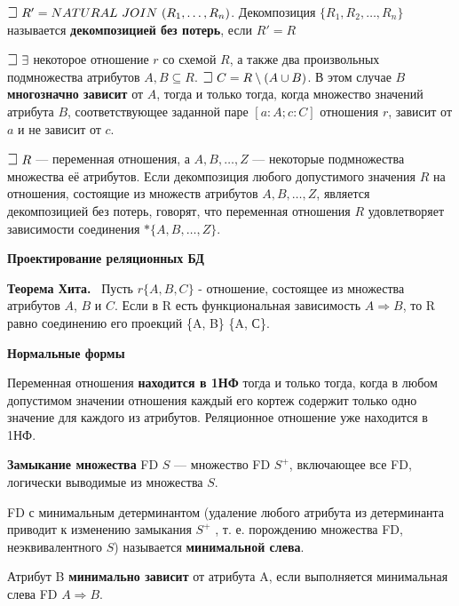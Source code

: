 $\mathLet ~ R' = NATURAL~JOIN~(R_1, \dots, R_n)$.
Декомпозиция $\{R_1, R_2, \dots , R_n\}$ называется \textbf{декомпозицией без потерь}, если $R' = R$

$\mathLet  ~ \exists$ некоторое отношение $r$ со схемой $R$, а также два произвольных подмножества атрибутов $A,B\subseteq R$. 
$\mathLet ~ C = R \setminus (A\cup B)$.
В этом случае $B$ \textbf{многозначно зависит} от $A$, тогда и только тогда, когда множество значений атрибута $B$, соответствующее заданной паре $[a:A;c:C]$ отношения $r$, зависит от $a$ и не зависит от $c$.

$\mathLet ~ R$ --- переменная отношения, а $A, B, \dots, Z$ --- некоторые подмножества множества её атрибутов.
Если декомпозиция любого допустимого значения $R$ на отношения, состоящие из множеств атрибутов $A, B, \dots, Z$, является декомпозицией без потерь, говорят, что переменная отношения $R$ удовлетворяет зависимости соединения $\ast\{A, B, \dots, Z\}$.

\textbf{Проектирование реляционных БД}

\textbf{Теорема Хита.} 
\mathLet \ Пусть $r \{A, B, C\}$ - отношение, состоящее из множества атрибутов $A$, $B$ и $C$. Если в R есть функциональная зависимость $A \Rightarrow B$, то R равно соединению его проекций \{A, B\} \{A, С\}.


\textbf{Нормальные формы}

Переменная отношения \textbf{находится в 1НФ} тогда и только тогда, когда в любом допустимом значении отношения каждый его кортеж содержит только одно значение для каждого из атрибутов. 
Реляционное отношение уже находится в 1НФ.

\textbf{Замыкание множества} FD $S$ --- множество FD $S^+$, включающее все FD, логически выводимые из множества $S$.

FD с минимальным детерминантом (удаление любого атрибута из детерминанта приводит к изменению замыкания $S^+$ , т. е. порождению множества FD, неэквивалентного $S$) называется \textbf{минимальной слева}. 

Атрибут B \textbf{минимально зависит} от атрибута A, если выполняется минимальная слева FD $A \Rightarrow B$.

